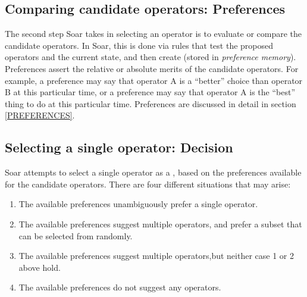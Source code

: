 \subsection{Comparing candidate operators: Preferences}

The second step Soar takes in selecting an operator is to evaluate or
compare the candidate operators. In Soar, this is done via rules that
test the proposed operators and the current state, and then create
 (stored in \emph{preference memory}).  Preferences assert the relative or absolute merits of the
candidate operators. For example, a preference may say that operator A
is a ``better'' choice than operator B at this particular time, or a
preference may say that operator A is the ``best'' thing to do at this
particular time. Preferences are discussed in detail in section \ref{PREFERENCES}. 

\subsection{Selecting a single operator: Decision}

Soar attempts to select a single operator as a , based on the preferences available
for the candidate operators. There are four different situations that may
arise:\vspace{-14pt}

\begin{enumerate}
\item The available preferences unambiguously prefer a single operator.\vspace{-
6pt}
\item The available preferences suggest multiple operators, and 
       prefer a subset that can be selected from randomly.\vspace{-6pt}
\item The available preferences suggest multiple operators,but neither case
       1 or 2 above hold.\vspace{-6pt}
\item The available preferences do not suggest any operators.
\end{enumerate}

